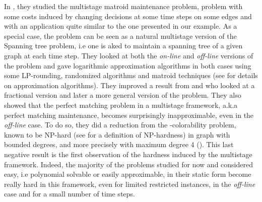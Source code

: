 \documentclass[a4paper]{book}
\begin{document}
In \cite{Gupta}, they studied the {\sc multistage matroid maintenance} problem, problem with some costs induced by changing decisions at some time steps on some edges and with an application quite similar to the one presented in our example. As a special case, the problem can be seen as a natural multistage version of the {\sc Spanning tree} problem, i.e one is aked to maintain a {\sc spanning tree} of a given graph at each time step.  They looked at both the \emph{on-line} and \emph{off-line} versions of the problem and gave logarithmic approximation algorithms in both cases using some LP-rounding, randomized algorithms and matroid techniques (see \cite{vazirani2013approximation} for details on approximation algorithms). They improved a result from \cite{buchbinder2012unified} and \cite{buchbinder2014competitive} who looked at a fractional version and later a more general version of the problem. They also showed that the {\sc perfect matching} problem in a multistage framework, a.k.a {\sc perfect matching maintenance}, becomes surprisingly inapproximable, even in the \emph{off-line} case. To do so, they did a reduction from the {-colorability} problem, known to be NP-hard (see \cite{gj} for a definition of NP-hardness) in graph with bounded degrees, and more precisely with maximum degree 4 (\cite{guruswami2004hardness}). This last negative result is the first observation of the hardness induced by the multistage framework. Indeed, the majority of the problems studied for now and considered easy, i.e polynomial solvable or easily approximable, in their static form become really hard in this framework, even for limited restricted instances, in the \emph{off-line} case and for a small number of time steps.\\
\end{document}
